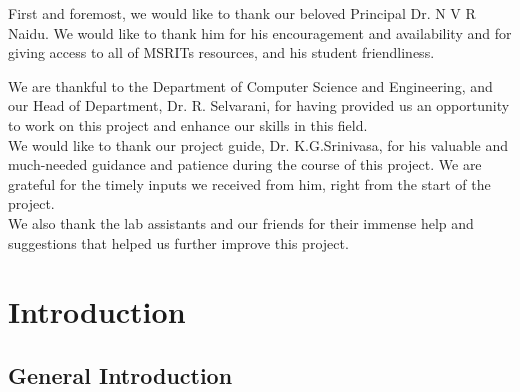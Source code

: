 \documentclass[12pt]{report}			%
\begin{document}
First and foremost, we would like to thank our beloved Principal Dr. N V R Naidu. We would like to thank him for his encouragement and availability and for giving access to all of MSRITs resources, and his student friendliness.

We are thankful to the Department of Computer Science and Engineering, and our Head of Department, Dr. R. Selvarani, for having provided us an opportunity to work on this project and enhance our skills in this field.\\[2ex]
We would like to thank our project guide, Dr. K.G.Srinivasa, for his valuable and much-needed guidance and patience during the course of this project. We are grateful for the timely inputs we received from him, right from the start of the project.\\[2ex]
We also thank the lab assistants and our friends for their immense help and suggestions that helped us further improve this project. 

\newpage				%

\section*{}
\tableofcontents			%

\newpage				%
\section*{}
\listoffigures


\newpage				%
\section*{}
\listoftables
\newpage				%

\chapter{ Introduction }	%


\section{ General Introduction }
\end{document}
